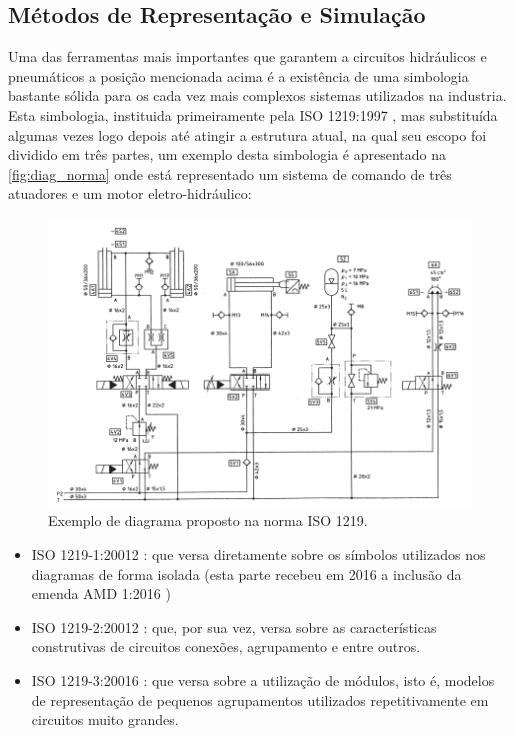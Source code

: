 \subsection{Métodos de Representação e Simulação}

Uma das ferramentas mais importantes que garantem a circuitos hidráulicos e pneumáticos a posição mencionada acima é a 
existência de uma simbologia bastante sólida para os cada vez mais complexos sistemas utilizados na industria. Esta simbologia,
instituida primeiramente pela ISO 1219:1997 \cite{ISO1219:1997}, mas substituída algumas vezes logo depois até atingir a
estrutura atual, na qual seu escopo foi dividido em três partes, um exemplo desta simbologia é apresentado na 
\autoref{fig:diag_norma} onde está representado um sistema de comando de três atuadores e um motor eletro-hidráulico:

\begin{figure}[htb]
    \begin{center}
	    \includegraphics[scale=0.5]{figs/std-example.png}
	\end{center}
	\caption{\label{fig:diag_norma} Exemplo de diagrama proposto na norma ISO 1219.} 
\end{figure}

\begin{itemize}

    \item ISO 1219-1:20012 \cite{ISO1219-1:2012}: que versa diretamente sobre os símbolos utilizados nos diagramas de 
    forma isolada (esta parte recebeu em 2016 a inclusão da emenda AMD 1:2016 \cite{ISO1219-1:2012/AMD-1:2016}) 
    \item ISO 1219-2:20012 \cite{ISO1219-2:2012}: que, por sua vez, versa sobre as características construtivas de 
    circuitos conexões, agrupamento e entre outros. 
    \item ISO 1219-3:20016 \cite{ISO1219-3:2016}: que versa sobre a utilização de módulos, isto é, modelos de representação
    de pequenos agrupamentos utilizados repetitivamente em circuitos muito grandes.

\end{itemize}

